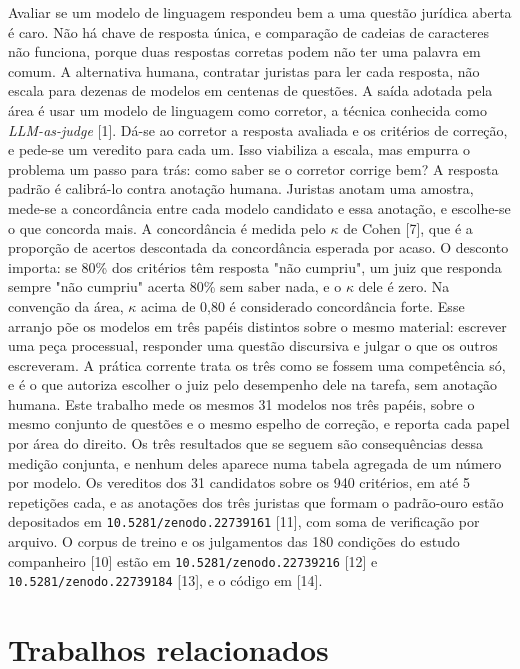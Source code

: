 \documentclass{IOS-Book-Article}
\begin{document}
Avaliar se um modelo de linguagem respondeu bem a uma questão jurídica aberta é caro. Não há chave de resposta única, e comparação de cadeias de caracteres não funciona, porque duas respostas corretas podem não ter uma palavra em comum. A alternativa humana, contratar juristas para ler cada resposta, não escala para dezenas de modelos em centenas de questões. A saída adotada pela área é usar um modelo de linguagem como corretor, a técnica conhecida como \emph{LLM-as-judge} [1]. Dá-se ao corretor a resposta avaliada e os critérios de correção, e pede-se um veredito para cada um. Isso viabiliza a escala, mas empurra o problema um passo para trás: como saber se o corretor corrige bem? A resposta padrão é calibrá-lo contra anotação humana. Juristas anotam uma amostra, mede-se a concordância entre cada modelo candidato e essa anotação, e escolhe-se o que concorda mais. A concordância é medida pelo $\kappa$ de Cohen [7], que é a proporção de acertos descontada da concordância esperada por acaso. O desconto importa: se 80\% dos critérios têm resposta "não cumpriu", um juiz que responda sempre "não cumpriu" acerta 80\% sem saber nada, e o $\kappa$ dele é zero. Na convenção da área, $\kappa$ acima de 0,80 é considerado concordância forte. Esse arranjo põe os modelos em três papéis distintos sobre o mesmo material: escrever uma peça processual, responder uma questão discursiva e julgar o que os outros escreveram. A prática corrente trata os três como se fossem uma competência só, e é o que autoriza escolher o juiz pelo desempenho dele na tarefa, sem anotação humana. Este trabalho mede os mesmos 31 modelos nos três papéis, sobre o mesmo conjunto de questões e o mesmo espelho de correção, e reporta cada papel por área do direito. Os três resultados que se seguem são consequências dessa medição conjunta, e nenhum deles aparece numa tabela agregada de um número por modelo. Os vereditos dos 31 candidatos sobre os 940 critérios, em até 5 repetições cada, e as anotações dos três juristas que formam o padrão-ouro estão depositados em \texttt{10.5281/zenodo.22739161} [11], com soma de verificação por arquivo. O corpus de treino e os julgamentos das 180 condições do estudo companheiro [10] estão em \texttt{10.5281/zenodo.22739216} [12] e \texttt{10.5281/zenodo.22739184} [13], e o código em [14].

\section{Trabalhos relacionados}
\end{document}

